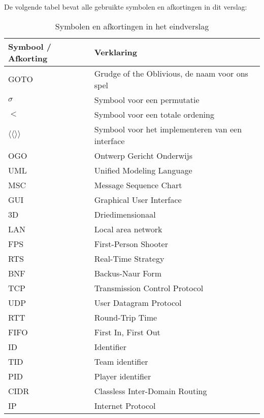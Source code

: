     De volgende tabel bevat alle gebruikte symbolen en afkortingen in dit verslag:
    \begin{table}[H]
        \small
        \centering
        \begin{tabular}{| l | l |}
        \hline
        Symbool / Afkorting & Verklaring \\ \hline
        GOTO & Grudge of the Oblivious, de naam voor ons spel \\ \hline
        $\sigma$ & Symbool voor een permutatie \\ \hline
        $<$ & Symbool voor een totale ordening \\ \hline
        $\langle\langle \rangle\rangle$ & Symbool voor het implementeren van een interface \\ \hline
        OGO & Ontwerp Gericht Onderwijs \\ \hline
        UML & Unified Modeling Language \\ \hline
        MSC & Message Sequence Chart \\ \hline
        GUI & Graphical User Interface \\ \hline
        3D & Driedimensionaal \\ \hline
        LAN & Local area network \\ \hline
        FPS & First-Person Shooter \\ \hline
        RTS & Real-Time Strategy \\ \hline
        BNF & Backus-Naur Form \\ \hline
        TCP & Transmission Control Protocol \\ \hline
        UDP & User Datagram Protocol \\ \hline
        RTT & Round-Trip Time \\ \hline
        FIFO & First In, First Out \\ \hline
        ID & Identifier \\ \hline
        TID & Team identifier \\ \hline
        PID & Player identifier \\ \hline
        CIDR & Classless Inter-Domain Routing \\ \hline
        IP & Internet Protocol \\ \hline
        \end{tabular}
        \caption{Symbolen en afkortingen in het eindverslag}
        \label{tab:planning}
    \end{table} 